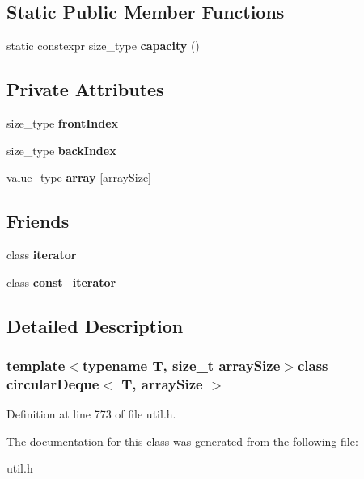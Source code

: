 \subsection*{Static Public Member Functions}
\begin{DoxyCompactItemize}
\item 
\hypertarget{classcircularDeque_aa40ac025e9668879d8c8e07fcce79f48}{static constexpr size\+\_\+type {\bfseries capacity} ()}\label{classcircularDeque_aa40ac025e9668879d8c8e07fcce79f48}

\end{DoxyCompactItemize}
\subsection*{Private Attributes}
\begin{DoxyCompactItemize}
\item 
\hypertarget{classcircularDeque_af64b4fbb5045a74a52c9d088c01111bf}{size\+\_\+type {\bfseries front\+Index}}\label{classcircularDeque_af64b4fbb5045a74a52c9d088c01111bf}

\item 
\hypertarget{classcircularDeque_adb67745fe0b548b805863c34762f27e2}{size\+\_\+type {\bfseries back\+Index}}\label{classcircularDeque_adb67745fe0b548b805863c34762f27e2}

\item 
\hypertarget{classcircularDeque_a554afa6a60a471cd9f6be80ca6605590}{value\+\_\+type {\bfseries array} \mbox{[}array\+Size\mbox{]}}\label{classcircularDeque_a554afa6a60a471cd9f6be80ca6605590}

\end{DoxyCompactItemize}
\subsection*{Friends}
\begin{DoxyCompactItemize}
\item 
\hypertarget{classcircularDeque_a67171474c4da6cc8efe0c7fafefd2b2d}{class {\bfseries iterator}}\label{classcircularDeque_a67171474c4da6cc8efe0c7fafefd2b2d}

\item 
\hypertarget{classcircularDeque_ac220ce1c155db1ac44146c12d178056f}{class {\bfseries const\+\_\+iterator}}\label{classcircularDeque_ac220ce1c155db1ac44146c12d178056f}

\end{DoxyCompactItemize}


\subsection{Detailed Description}
\subsubsection*{template$<$typename T, size\+\_\+t array\+Size$>$class circular\+Deque$<$ T, array\+Size $>$}



Definition at line 773 of file util.\+h.



The documentation for this class was generated from the following file\+:\begin{DoxyCompactItemize}
\item 
util.\+h\end{DoxyCompactItemize}
